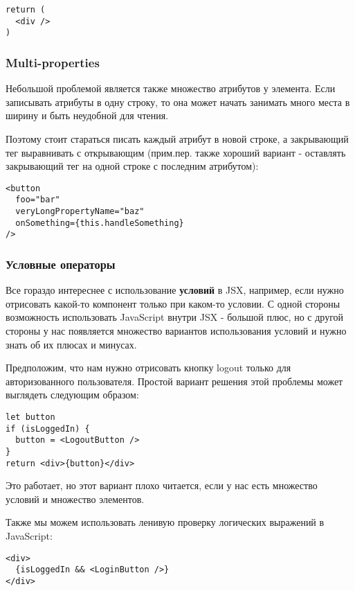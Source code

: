 \begin{lstlisting}
return (
  <div />
)
\end{lstlisting}

\subsubsection*{Multi-properties}

Небольшой проблемой является также множество атрибутов у элемента. Если записывать атрибуты в одну строку, то она может начать занимать много места в ширину и быть неудобной для чтения. 

Поэтому стоит стараться писать каждый атрибут в новой строке, а закрывающий тег выравнивать с открывающим (прим.пер. также хороший вариант - оставлять закрывающий тег на одной строке с последним атрибутом):

\begin{lstlisting}
<button
  foo="bar"
  veryLongPropertyName="baz"
  onSomething={this.handleSomething}
/>
\end{lstlisting}

\subsubsection*{Условные операторы}

Все гораздо интереснее с использование \textbf{условий} в JSX, например, если нужно отрисовать какой-то компонент только при каком-то условии. С одной стороны возможность использовать JavaScript внутри JSX - большой плюс, но с другой стороны у нас появляется множество вариантов использования условий и нужно знать об их плюсах и минусах.

Предположим, что нам нужно отрисовать кнопку logout только для авторизованного пользователя. Простой вариант решения этой проблемы может выглядеть следующим образом:

\begin{lstlisting}
let button
if (isLoggedIn) {
  button = <LogoutButton />
}
return <div>{button}</div>
\end{lstlisting}
   
Это работает, но этот вариант плохо читается, если у нас есть множество условий и множество элементов.

Также мы можем использовать ленивую проверку логических выражений в JavaScript:

\begin{lstlisting}
<div>
  {isLoggedIn && <LoginButton />}
</div>
\end{lstlisting}

